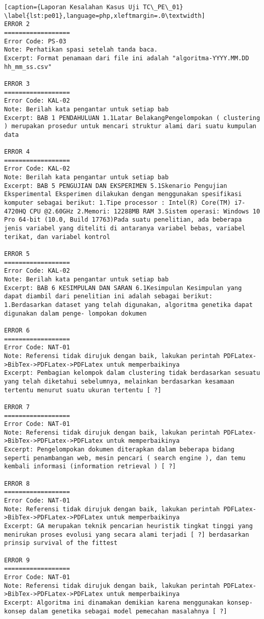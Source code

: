 \begin{enumerate}
\begin{lstlisting}[caption={Laporan Kesalahan Kasus Uji TC\_PE\_01}	\label{lst:pe01},language=php,xleftmargin=.0\textwidth]
ERROR 2
==================
Error Code: PS-03
Note: Perhatikan spasi setelah tanda baca.
Excerpt: Format penamaan dari file ini adalah "algoritma-YYYY.MM.DD hh_mm_ss.csv"

ERROR 3
==================
Error Code: KAL-02
Note: Berilah kata pengantar untuk setiap bab
Excerpt: BAB 1 PENDAHULUAN 1.1Latar BelakangPengelompokan ( clustering ) merupakan prosedur untuk mencari struktur alami dari suatu kumpulan data

ERROR 4
==================
Error Code: KAL-02
Note: Berilah kata pengantar untuk setiap bab
Excerpt: BAB 5 PENGUJIAN DAN EKSPERIMEN 5.1Skenario Pengujian Eksperimental Eksperimen dilakukan dengan menggunakan spesifikasi komputer sebagai berikut: 1.Tipe processor : Intel(R) Core(TM) i7-4720HQ CPU @2.60GHz 2.Memori: 12288MB RAM 3.Sistem operasi: Windows 10 Pro 64-bit (10.0, Build 17763)Pada suatu penelitian, ada beberapa jenis variabel yang diteliti di antaranya variabel bebas, variabel terikat, dan variabel kontrol

ERROR 5
==================
Error Code: KAL-02
Note: Berilah kata pengantar untuk setiap bab
Excerpt: BAB 6 KESIMPULAN DAN SARAN 6.1Kesimpulan Kesimpulan yang dapat diambil dari penelitian ini adalah sebagai berikut: 1.Berdasarkan dataset yang telah digunakan, algoritma genetika dapat digunakan dalam penge- lompokan dokumen

ERROR 6
==================
Error Code: NAT-01
Note: Referensi tidak dirujuk dengan baik, lakukan perintah PDFLatex->BibTex->PDFLatex->PDFLatex untuk memperbaikinya
Excerpt: Pembagian kelompok dalam clustering tidak berdasarkan sesuatu yang telah diketahui sebelumnya, melainkan berdasarkan kesamaan tertentu menurut suatu ukuran tertentu [ ?]

ERROR 7
==================
Error Code: NAT-01
Note: Referensi tidak dirujuk dengan baik, lakukan perintah PDFLatex->BibTex->PDFLatex->PDFLatex untuk memperbaikinya
Excerpt: Pengelompokan dokumen diterapkan dalam beberapa bidang seperti penambangan web, mesin pencari ( search engine ), dan temu kembali informasi (information retrieval ) [ ?]

ERROR 8
==================
Error Code: NAT-01
Note: Referensi tidak dirujuk dengan baik, lakukan perintah PDFLatex->BibTex->PDFLatex->PDFLatex untuk memperbaikinya
Excerpt: GA merupakan teknik pencarian heuristik tingkat tinggi yang menirukan proses evolusi yang secara alami terjadi [ ?] berdasarkan prinsip survival of the fittest 

ERROR 9
==================
Error Code: NAT-01
Note: Referensi tidak dirujuk dengan baik, lakukan perintah PDFLatex->BibTex->PDFLatex->PDFLatex untuk memperbaikinya
Excerpt: Algoritma ini dinamakan demikian karena menggunakan konsep-konsep dalam genetika sebagai model pemecahan masalahnya [ ?]


\end{lstlisting}
\end{enumerate}
